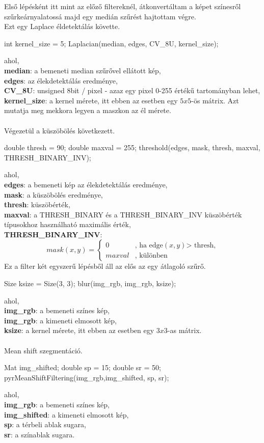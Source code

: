 Első lépésként itt mint az előző filtereknél, átkonvertáltam a képet színesről szűrkeárnyalatossá majd egy medián szűrést hajtottam végre.\\
Ezt egy Laplace éldetektálás követte.
\begin{cpp}
int kernel_size = 5;  
Laplacian(median, edges, CV_8U, kernel_size);
\end{cpp}
 ahol, \\
\indent \textbf{median}: a bemeneti median szűrővel ellátott kép,\\
\indent \textbf{edges}: az élekdetektálás eredménye,\\
\indent \textbf{CV\_8U}: unsigned 8bit / pixel - azaz egy pixel 0-255 értékű tartományban lehet,\\
\indent \textbf{kernel\_size}: a kernel mérete, itt ebben az esetben egy $5 x 5$-ös mátrix. Azt mutatja meg mekkora legyen a maszkon az él mérete.\\ \\
Végezetül a küszöbölés következett.
\begin{cpp}
double thresh = 90;
double maxval = 255;
threshold(edges, mask, thresh, maxval, THRESH_BINARY_INV);
\end{cpp}
 ahol, \\
\indent \textbf{edges}: a bemeneti kép az élekdetektálás eredménye,\\
\indent \textbf{mask}: a küszöbölés eredménye,\\
\indent \textbf{thresh}: küszöbérték,\\
\indent \textbf{maxval}: a THRESH\_BINARY és a THRESH\_BINARY\_INV küszöbérték típusokhoz használható maximális érték,\\
\indent \textbf{THRESH\_BINARY\_INV}:
 \[
 mask(x,y)=\left\{
 \begin{array}{ll}
 0 & \mbox{, ha edge$(x,y)$> thresh,}\\
 maxval & \mbox{, különben}
 \end{array}
 \right.
\]
Ez a filter két egyszerű lépésből áll az elős az egy átlagoló szűrő.
\begin{cpp}
Size ksize = Size(3, 3);
blur(img_rgb, img_rgb, ksize);
\end{cpp}
 ahol, \\
\indent \textbf{img\_rgb}: a bemeneti színes kép,\\
\indent \textbf{img\_rgb}: a kimeneti elmosott kép,\\
\indent \textbf{ksize}: a kernel mérete, itt ebben az esetben egy $3 x 3$-as mátrix. \\ \\
Mean shift szegmentáció.
\begin{cpp}
Mat img_shifted;
double sp = 15;
double sr = 50;
pyrMeanShiftFiltering(img_rgb,img_shifted, sp, sr);
\end{cpp}
 ahol, \\
\indent \textbf{img\_rgb}: a bemeneti színes kép,\\
\indent \textbf{img\_shifted}: a kimeneti elmosott kép,\\
\indent \textbf{sp}: a térbeli ablak sugara,\\
\indent \textbf{sr}: a színablak sugara.



